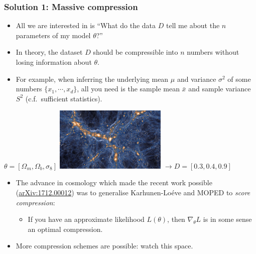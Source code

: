 \documentclass[%
    9pt,
]{beamer}
\newcommand{\arxiv}[1]{\href{https://arxiv.org/abs/#1}{arXiv:#1}}
\begin{document}
\begin{frame}
  \frametitle{Solution 1: Massive compression}
      \begin{itemize}
          \item All we are interested in is ``What do the data $D$ tell me about the $n$ parameters of my model $\theta$?''
          \item In theory, the dataset $D$ should be compressible into $n$ numbers without losing information about $\theta$.
          \item For example, when inferring the underlying mean $\mu$ and variance $\sigma^2$ of some numbers $\{x_1,\cdots,x_d\}$, all you need is the sample mean $\bar{x}$ and sample variance $S^2$ (c.f.\ sufficient statistics).
      \end{itemize}
      {\Large
      $\theta = [\Omega_m, \Omega_b, \sigma_8]$
      \hfill
      \includegraphics[align=c,width=0.4\textwidth]{./figures/simulation.jpg}
      \hfill
      $\longrightarrow  D=[0.3, 0.4, 0.9]$
      }
      \begin{itemize}
          \item The advance in cosmology which made the recent work possible (\arxiv{1712.00012}) was to generalise Karhunen-Lo\'{e}ve  and MOPED to {\em score  compression}:
              \begin{itemize}
                  \item If you have an approximate likelihood $L(\theta)$, then $\nabla_\theta L$ is in some sense an optimal compression.
              \end{itemize}
          \item More compression schemes are possible: watch this space.
      \end{itemize}
\end{frame}
\end{document}
